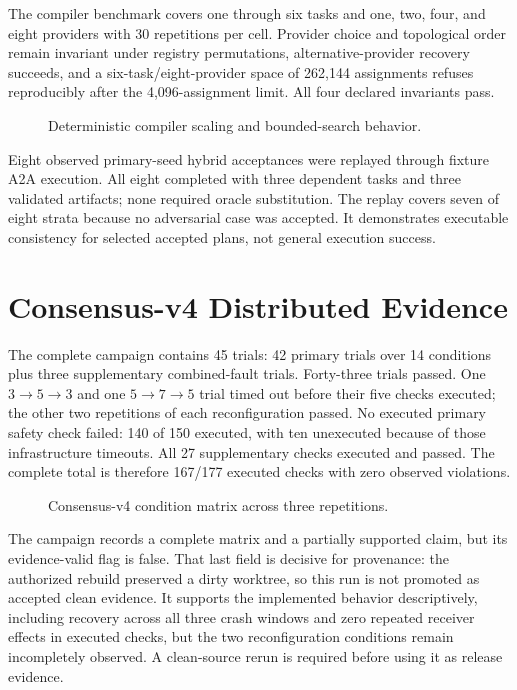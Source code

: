 The compiler benchmark covers one through six tasks and one, two, four, and eight providers with 30 repetitions per cell. Provider choice and topological order remain invariant under registry permutations, alternative-provider recovery succeeds, and a six-task/eight-provider space of 262,144 assignments refuses reproducibly after the 4,096-assignment limit. All four declared invariants pass.

\begin{figure}[htbp]
\centering

\caption{Deterministic compiler scaling and bounded-search behavior.}
\label{fig:v07-compiler-scaling}
\end{figure}

Eight observed primary-seed hybrid acceptances were replayed through fixture A2A execution. All eight completed with three dependent tasks and three validated artifacts; none required oracle substitution. The replay covers seven of eight strata because no adversarial case was accepted. It demonstrates executable consistency for selected accepted plans, not general execution success.

\section{Consensus-v4 Distributed Evidence}

The complete campaign contains 45 trials: 42 primary trials over 14 conditions plus three supplementary combined-fault trials. Forty-three trials passed. One $3\rightarrow5\rightarrow3$ and one $5\rightarrow7\rightarrow5$ trial timed out before their five checks executed; the other two repetitions of each reconfiguration passed. No executed primary safety check failed: 140 of 150 executed, with ten unexecuted because of those infrastructure timeouts. All 27 supplementary checks executed and passed. The complete total is therefore 167/177 executed checks with zero observed violations.

\begin{figure}[htbp]
\centering

\caption{Consensus-v4 condition matrix across three repetitions.}
\label{fig:v07-consensus-matrix}
\end{figure}

The campaign records a complete matrix and a partially supported claim, but its evidence-valid flag is false. That last field is decisive for provenance: the authorized rebuild preserved a dirty worktree, so this run is not promoted as accepted clean evidence. It supports the implemented behavior descriptively, including recovery across all three crash windows and zero repeated receiver effects in executed checks, but the two reconfiguration conditions remain incompletely observed. A clean-source rerun is required before using it as release evidence.

